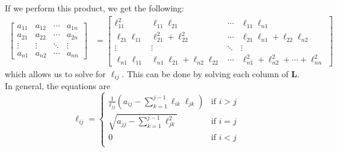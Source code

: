 \documentclass{article}
\begin{document}
If we perform this product, we get the following:
\begin{align*}
    \begin{bmatrix*}
        a_{11} & a_{12} & \cdots & a_{1n} \\
        a_{21} & a_{22} & \cdots & a_{2n} \\
        \vdots & \vdots & \ddots & \vdots \\
        a_{n1} & a_{n2} & \cdots & a_{nn}
    \end{bmatrix*}
     & =
    \begin{bmatrix*}
        \ell_{11}^2        & \ell_{11} \ell_{21} & \cdots & \ell_{11} \ell_{n1} \\
        \ell_{21} \ell_{11} & \ell_{21}^2 + \ell_{22}^2 & \cdots & \ell_{21} \ell_{n1} + \ell_{22} \ell_{n2} \\
        \vdots        & \vdots & \ddots & \vdots \\
        \ell_{n1} \ell_{11} & \ell_{n1} \ell_{21} + \ell_{n2} \ell_{22} & \cdots & \ell_{n1}^2 + \ell_{n2}^2 + \cdots + \ell_{nn}^2
    \end{bmatrix*}
\end{align*}
which allows us to solve for \(\ell_{ij}\). This can be done by solving
each column of \(\symbf{L}\). In general, the equations are
\begin{equation*}
    \ell_{ij} =
    \begin{cases}
        \frac{1}{\ell_{jj}} \left( a_{ij} - \sum_{k = 1}^{j - 1} \ell_{ik} \ell_{jk} \right) & \text{if \(i > j\)} \\
        \sqrt{a_{jj} - \sum_{k = 1}^{j - 1} \ell_{jk}^2}                                     & \text{if \(i = j\)} \\
        0                                                                                    & \text{if \(i < j\)} \\
    \end{cases}
\end{equation*}
\end{document}
